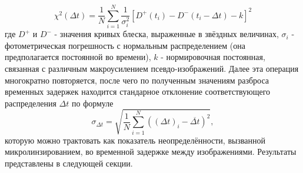 \begin{equation}\label{chi2}
\chi^{2}(\Delta t)=\frac{1}{N} \sum_{i=1}^{N} \frac{1}{\sigma_{i}^{2}}\left[D^{+}\left(t_{i}\right)-D^{-}\left(t_{i}-\Delta t\right)-k\right]^{2}
\end{equation}
где $D^+$ и $D^-$ - значения кривых блеска, выраженные в звёздных величинах, $\sigma_i$ - фотометрическая погрешность с нормальным распределением (она предполагается постоянной во времени), $k$ - нормировочная постоянная, связанная с различным макроусилением псевдо-изображений. Далее эта операция многократно повторяется, после чего по полученным значениям разброса временных задержек находится стандарное отклонение соответствующего распределения $\Delta t$ по формуле
\begin{equation}\label{sigmadeltat}
\sigma_{\Delta t}=\sqrt{\frac{1}{N} \sum_{i=1}^{N}\left((\Delta t)_{i}-\overline{\Delta t}\right)^{2}},
\end{equation}
которую можно трактовать как показатель неопределённости, вызванной микролинзированием, во временной задержке между изображениями. Результаты представлены в следующей секции.
